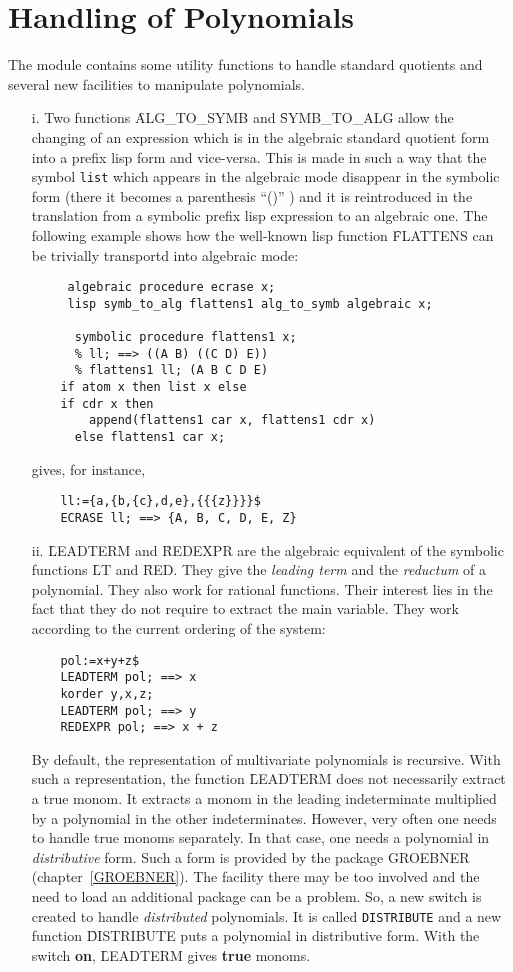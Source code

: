 \section{Handling of Polynomials}

The module contains some utility functions to handle
standard quotients and several new facilities to manipulate polynomials.
\begin{itemize}
\item[i.] Two functions \f{ALG\_TO\_SYMB} and
\f{SYMB\_TO\_ALG} allow the changing of an expression
which is in the algebraic standard quotient form into a prefix lisp
form and vice-versa.  This is made
in such a way that the symbol \verb+list+ which appears in the
algebraic mode disappear in the symbolic form (there it becomes
a parenthesis ``()'' ) and it is reintroduced in the translation
from a symbolic prefix lisp expression  to an algebraic one.
The following example shows how the well-known lisp function
\f{FLATTENS} can be trivially transportd into algebraic mode:
\begin{verbatim}
     algebraic procedure ecrase x;
     lisp symb_to_alg flattens1 alg_to_symb algebraic x;

      symbolic procedure flattens1 x;
      % ll; ==> ((A B) ((C D) E))
      % flattens1 ll; (A B C D E)
	if atom x then list x else
	if cdr x then
	    append(flattens1 car x, flattens1 cdr x)
	  else flattens1 car x;
\end{verbatim}
gives, for instance,
\begin{verbatim}
	ll:={a,{b,{c},d,e},{{{z}}}}$
	ECRASE ll; ==> {A, B, C, D, E, Z}
\end{verbatim}
\item[ii.]  \f{LEADTERM} and
\f{REDEXPR} are the algebraic equivalent of the
symbolic functions \f{LT} and \f{RED}.  They give the
{\em leading term} and the {\em reductum} of a polynomial. They also
work for rational functions. Their interest lies in the fact that they
do not require to extract the main variable. They work according to
the current ordering of the system:
\begin{verbatim}
	pol:=x+y+z$
	LEADTERM pol; ==> x
	korder y,x,z;
	LEADTERM pol; ==> y
	REDEXPR pol; ==> x + z
\end{verbatim}
By default, the representation of multivariate polynomials is recursive.
With such a representation, the function \f{LEADTERM} does not necessarily
extract a true monom.  It extracts a monom in the leading indeterminate
multiplied by a polynomial in the other indeterminates.  However, very often
one needs to handle true monoms separately.  In that case, one needs a
polynomial in {\em distributive} form.  Such a form is provided by the
package GROEBNER (chapter~\ref{GROEBNER}).  The facility there may be
too involved and the need to load an additional package can be a
problem.  So,
a new switch is created to handle {\em distributed} polynomials. It is
called {\tt DISTRIBUTE} and a new function
\label{DISTRIBUTE} \f{DISTRIBUTE} puts a polynomial in distributive
form.  With the switch {\bf on}, \f{LEADTERM} gives {\bf true} monoms.


\end{itemize}
